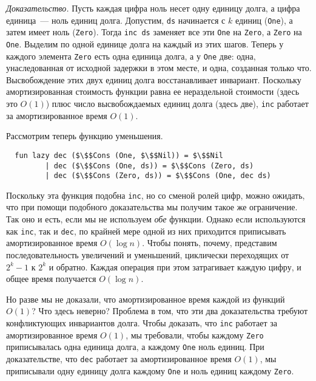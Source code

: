 \emph{Доказательство.} Пусть каждая цифра ноль несет одну единицу долга, а
цифра единица~--- ноль единиц долга. Допустим, \lstinline!ds!
начинается с $k$ единиц (\lstinline!One!), а затем имеет ноль
(\lstinline!Zero!). Тогда \lstinline!inc ds! заменяет все эти \lstinline!One!
на \lstinline!Zero!, а \lstinline!Zero! на \lstinline!One!.
Выделим по одной единице долга на каждый
из этих шагов. Теперь у каждого элемента \lstinline!Zero! есть одна
единица долга, а у \lstinline!One! две: одна, унаследованная от
исходной задержки в этом месте, и одна, созданная только
что. Высвобождение этих двух единиц долга восстанавливает
инвариант. Поскольку амортизированная стоимость функции равна ее
нераздельной стоимости (здесь это $O(1)$) плюс число высвобождаемых
единиц долга (здесь две), \lstinline!inc! работает за амортизированное
время $O(1)$.

Рассмотрим теперь функцию уменьшения.
\begin{lstlisting}
  fun lazy dec ($\$$Cons (One, $\$$Nil)) = $\$$Nil
         | dec ($\$$Cons (One, ds)) = $\$$Cons (Zero, ds)
         | dec ($\$$Cons (Zero, ds)) = $\$$Cons (One, dec ds)
\end{lstlisting}
Поскольку эта функция подобна \lstinline!inc!, но
со сменой ролей цифр, можно ожидать, что при помощи подобного
доказательства мы получим такое же ограничение. Так оно и есть, если
мы не используем \emph{обе} функции. Однако если используются как
\lstinline!inc!, так и \lstinline!dec!, по крайней мере одной из них
приходится приписывать амортизированное время $O(\log n)$. Чтобы понять,
почему, представим последовательность увеличений и уменьшений,
циклически переходящих от $2^k - 1$ к $2^k$ и обратно. Каждая операция
при этом затрагивает каждую цифру, и общее время получается $O(\log
n)$.

Но разве мы не доказали, что амортизированное время каждой из функций
$O(1)$? Что здесь неверно? Проблема в том, что эти два доказательства
требуют конфликтующих инвариантов долга. Чтобы доказать, что
\lstinline!inc! работает за амортизированное время $O(1)$, мы
требовали, чтобы каждому \lstinline!Zero! приписывалась одна единица
долга, а каждому \lstinline!One! ноль единиц. При доказательстве, что
\lstinline!dec! работает за амортизированное время $O(1)$, мы
приписывали одну единицу долга каждому \lstinline!One! и ноль единиц
каждому \lstinline!Zero!.

